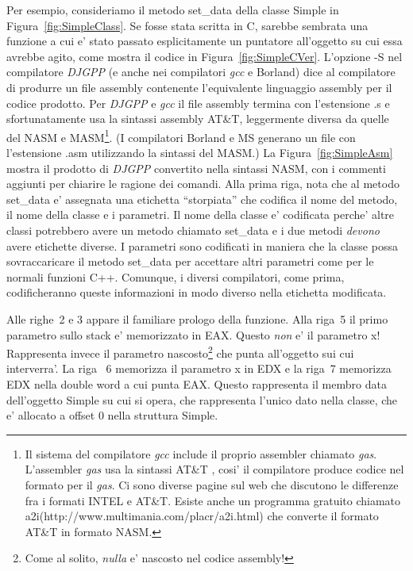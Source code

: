 Per esempio, consideriamo il metodo {\code set\_data} della classe
{\code Simple} in Figura~\ref{fig:SimpleClass}. Se fosse stata scritta
in C, sarebbe sembrata una funzione a cui e' stato passato esplicitamente
un puntatore all'oggetto su cui essa avrebbe agito, come mostra il codice in
Figura~\ref{fig:SimpleCVer}. L'opzione {\code -S} nel compilatore
\emph{DJGPP} (e anche nei compilatori \emph{gcc} e Borland) dice al
compilatore di produrre un file assembly contenente l'equivalente
linguaggio assembly per il codice prodotto. Per \emph{DJGPP} e \emph{gcc} 
il file assembly termina con l'estensione {\code .s} e sfortunatamente
usa la sintassi assembly AT\&T, leggermente diversa da quelle del NASM
e MASM\footnote{Il sistema del compilatore \emph{gcc} include il proprio
assembler chiamato \emph{gas}. L'assembler \emph{gas} usa
la sintassi AT\&T , cosi' il compilatore produce codice nel formato
per il \emph{gas}. Ci sono diverse pagine sul web che discutono le differenze
fra i formati INTEL e AT\&T. Esiste anche un programma gratuito chiamato
{\code a2i}({http://www.multimania.com/placr/a2i.html}) che converte
il formato AT\&T in formato NASM.}. (I compilatori Borland e MS
generano un file con l'estensione {\code .asm} utilizzando la sintassi
del MASM.)
La Figura~\ref{fig:SimpleAsm} mostra il prodotto di \emph{DJGPP} convertito
nella sintassi NASM, con i commenti aggiunti per chiarire le ragione
dei comandi. Alla prima riga, nota che al metodo {\code set\_data}
e' assegnata una etichetta ``storpiata'' che codifica il nome del metodo,
il nome della classe e i parametri. Il nome della classe e' codificata
perche' altre classi potrebbero avere un metodo chiamato {\code set\_data} e
i due metodi \emph{devono} avere etichette diverse. I parametri sono 
codificati in maniera che la classe possa sovraccaricare il metodo
{\code set\_data} per accettare altri parametri come per le normali
funzioni C++. Comunque, i diversi compilatori, come prima, codificheranno
queste informazioni in modo diverso nella etichetta modificata. 

Alle righe~2 e 3 appare il familiare prologo della funzione. Alla riga~5
il primo parametro sullo stack e' memorizzato in {\code EAX}. Questo
\emph{non} e' il parametro {\code x}! Rappresenta invece il parametro
nascosto\footnote{Come al solito, \emph{nulla} e' nascosto nel
codice assembly!} che punta all'oggetto sui cui interverra'. La riga
~6 memorizza il parametro {\code x} in {\code EDX} e la riga~7 
memorizza {\code EDX} nella double word a cui punta {\code EAX}. Questo
rappresenta il membro {\code data} dell'oggetto {\code Simple} su cui
si opera, che rappresenta l'unico dato nella classe, che e' allocato
a offset 0 nella struttura {\code Simple}. 

